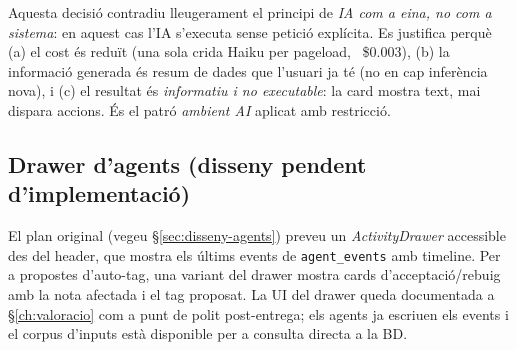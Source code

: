 Aquesta decisió contradiu lleugerament el principi de \emph{IA com a eina, no com a sistema}: en aquest cas l'IA s'executa sense petició explícita. Es justifica perquè (a) el cost és reduït (una sola crida Haiku per pageload, ~\$0.003), (b) la informació generada és resum de dades que l'usuari ja té (no en cap inferència nova), i (c) el resultat és \emph{informatiu i no executable}: la card mostra text, mai dispara accions. És el patró \emph{ambient AI} aplicat amb restricció.

\subsection{Drawer d'agents (disseny pendent d'implementació)}

El plan original (vegeu \S\ref{sec:disseny-agents}) preveu un \emph{ActivityDrawer} accessible des del header, que mostra els últims events de \texttt{agent\_events} amb timeline. Per a propostes d'auto-tag, una variant del drawer mostra cards d'acceptació/rebuig amb la nota afectada i el tag proposat. La UI del drawer queda documentada a \S\ref{ch:valoracio} com a punt de polit post-entrega; els agents ja escriuen els events i el corpus d'inputs està disponible per a consulta directa a la BD.

%
%
%
%
